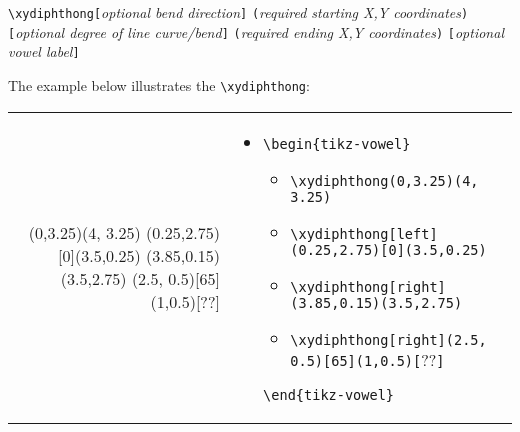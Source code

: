 \documentclass{article}
\def\\{}%
\def\charissil{}%
\begin{document}
\medskip
\qquad \verb+\xydiphthong[+\textit{optional bend direction}\verb+]+\\
\qquad\hspace*{11em} \verb+(+\textit{required starting X,Y coordinates}\verb+)+\\
\qquad\hspace*{11em} \verb+[+\textit{optional degree of line curve/bend}\verb+]+\\
\qquad\hspace*{11em} \verb+(+\textit{required ending X,Y coordinates}\verb+)+\\
\qquad\hspace*{11em} \verb+[+\textit{optional vowel label}\verb+]+\\
\bigskip

\noindent
The example below illustrates the \verb|\xydiphthong|:

\begin{center}
\begin{tabular}{rl}
  \begin{minipage}[t]{0.35\textwidth}
	{\large\charissil
		{\bfseries
		\begin{tikz-vowel}
			\xydiphthong(0,3.25)(4, 3.25)
			\xydiphthong[left](0.25,2.75)[0](3.5,0.25)
			\xydiphthong[right](3.85,0.15)(3.5,2.75)
			\xydiphthong[right](2.5, 0.5)[65](1,0.5)[??]
		\end{tikz-vowel}
		}
	}
  \end{minipage} &
  \begin{minipage}[t]{0.44\textwidth}
  \vspace{-90pt}
  {\small
\begin{itemize}[label={}]
	\item \verb|\begin{tikz-vowel}|
		\begin{itemize}[label={}]
			\item \verb|\xydiphthong(0,3.25)(4, 3.25)|
			\item \verb|\xydiphthong[left](0.25,2.75)[0](3.5,0.25)|
			\item \verb|\xydiphthong[right](3.85,0.15)(3.5,2.75)|
			\item \verb|\xydiphthong[right](2.5, 0.5)[65](1,0.5)[|{\charissil ??}\verb|]|
		\end{itemize}
	\verb|\end{tikz-vowel}|
\end{itemize}
    }
  \end{minipage}
\end{tabular}
\end{center}
\end{document}
